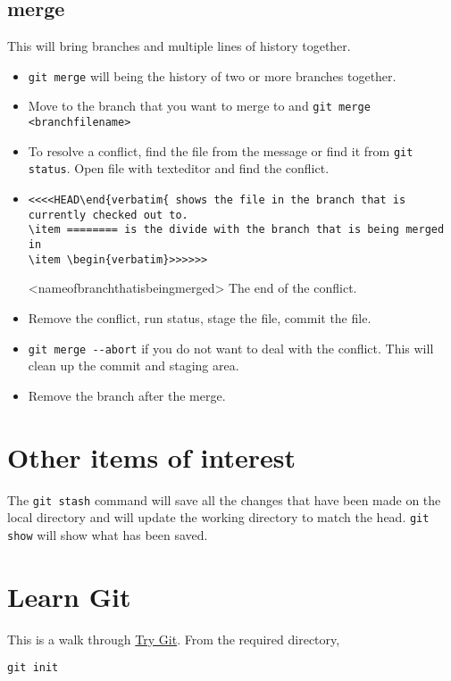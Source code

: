 \documentclass[11pt]{article} %
\begin{document}
\subsection{merge}
This will bring branches and multiple lines of history together. 
\begin{itemize}
\item \lstinline{git merge} will being the history of two or more branches together. 
\item Move to the branch that you want to merge to and \lstinline{git merge <branchfilename>} 
\item To resolve a conflict, find the file from the message or find it from \lstinline{git status}. Open file with texteditor and find the conflict. 
\item \begin{verbatim}<<<<HEAD\end{verbatim{ shows the file in the branch that is currently checked out to.
\item ======== is the divide with the branch that is being merged in
\item \begin{verbatim}>>>>>>\end{verbatim} <nameofbranchthatisbeingmerged>  The end of the conflict. 
\item Remove the conflict, run status, stage the file, commit the file.
\item \lstinline{git merge --abort} if you do not want to deal with the conflict. This will clean up the commit and staging area. 
\item Remove the branch after the merge. 
\end{itemize}



\section{Other items of interest}
The \lstinline{git stash} command will save all the changes that have been made on the local directory and will update the working directory to match the head.
\lstinline{git show} will show what has been saved. 
\section{Learn Git}
This  is a walk through \href{http://try.github.io}{Try Git}.  
From the required directory, 
\begin{lstlisting}
git init
\end{lstlisting}
\end{document}
